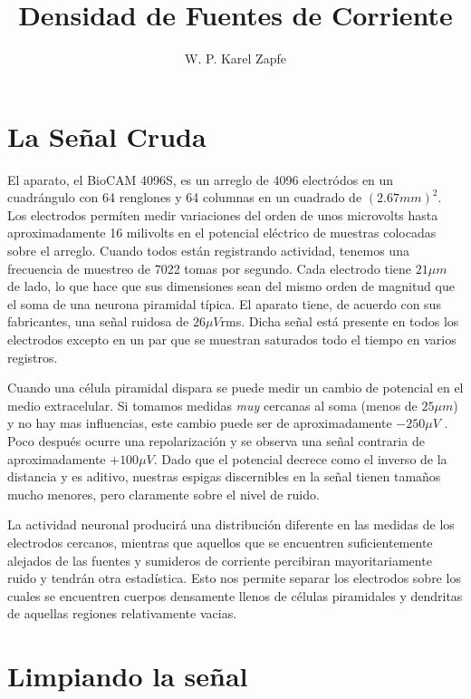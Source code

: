 \documentclass{article}
\title{Densidad de Fuentes de Corriente}
\author{W. P. Karel Zapfe}
\begin{document}
\maketitle

\section{La Señal Cruda}

El aparato, el BioCAM 4096S, es un arreglo de 4096 electródos en un 
cuadrángulo con 64 renglones y 64 columnas en un cuadrado de
$(2.67 mm)^2$. Los electrodos permíten medir variaciones del orden
de unos microvolts hasta aproximadamente 16 milivolts 
en el potencial eléctrico de muestras colocadas sobre el arreglo. Cuando
todos están registrando actividad, tenemos una frecuencia de muestreo
de 7022 tomas por segundo. Cada electrodo tiene $21 \mu m$ de lado, lo
que hace que sus dimensiones sean del mismo orden de magnitud que el 
soma de una neurona piramidal típica. El aparato tiene, de acuerdo
con sus fabricantes, una señal ruidosa de $26 \mu V$rms. Dicha señal
está presente en todos los electrodos excepto en un par que se
muestran saturados todo el tiempo en varios registros.

Cuando una célula piramidal dispara se puede medir un cambio de potencial
en el medio extracelular. Si tomamos medidas \emph{muy} cercanas al soma
(menos de $25 \mu m$)
y no hay mas influencias, este cambio puede ser de aproximadamente
$-250\mu V$ \cite{Obien2015}. Poco después ocurre una repolarización
y se observa una señal contraria de aproximadamente $+100\mu V$.
Dado que el potencial decrece como el inverso de la distancia
y es aditivo, nuestras espigas discernibles en la señal tienen tamaños mucho
menores, pero claramente sobre el nivel de ruido.

La actividad neuronal producirá una distribución diferente en las medidas
de los electrodos cercanos, mientras que aquellos que se encuentren
suficientemente alejados de las fuentes y sumideros de corriente
percibiran mayoritariamente ruido y tendrán otra estadística.
Esto nos permite separar los electrodos sobre los cuales
se encuentren cuerpos densamente llenos de células piramidales y dendritas
de aquellas regiones relativamente vacias. 



\section{Limpiando la señal}
\end{document}
